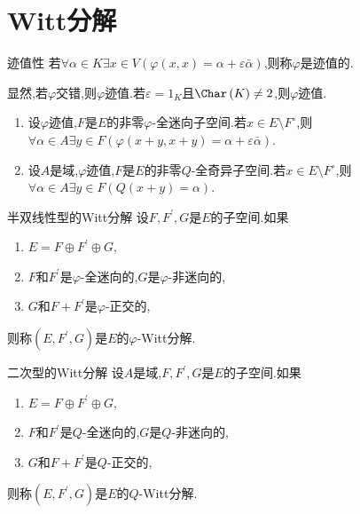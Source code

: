 \section{Witt分解}

\begin{definition}{迹值性}{}
	若$\forall\alpha\in K\exists x\in V\left(\varphi\left(x,x\right)=\alpha+\varepsilon\bar{\alpha}\right)$,则称$\varphi$是迹值的.
\end{definition}


\begin{remark}{}{}
	显然,若$\varphi$交错,则$\varphi$迹值.若$\varepsilon=1_{K}$且$\Char\left(K\right)\neq 2$,则$\varphi$迹值.
\end{remark}

\begin{lemma}{}{}
	\begin{enumerate}
		\item 设$\varphi$迹值,$F$是$E$的非零$\varphi$-全迷向子空间.若$x\in E\setminus F^{\circ}$,则$\forall\alpha\in A\exists y\in F\left(\varphi\left(x+y,x+y\right)=\alpha+\varepsilon\bar{\alpha}\right)$.
		\item 设$A$是域,$\varphi$迹值,$F$是$E$的非零$Q$-全奇异子空间.若$x\in E\setminus F^{\circ}$,则$\forall\alpha\in A\exists y\in F\left(Q\left(x+y\right)=\alpha\right)$.
	\end{enumerate}
\end{lemma}

\begin{definition}{半双线性型的Witt分解}{}
	设$F,F^{\prime},G$是$E$的子空间.如果
	\begin{enumerate}
		\item $E=F\oplus F^{\prime}\oplus G$,
		\item $F$和$F^{\prime}$是$\varphi$-全迷向的,$G$是$\varphi$-非迷向的,
		\item $G$和$F+F^{\prime}$是$\varphi$-正交的,
	\end{enumerate}
	则称$\left(E,F^{\prime},G\right)$是$E$的$\varphi$-Witt分解.
\end{definition}

\begin{definition}{二次型的Witt分解}{}
	设$A$是域,$F,F^{\prime},G$是$E$的子空间.如果
	\begin{enumerate}
		\item $E=F\oplus F^{\prime}\oplus G$,
		\item $F$和$F^{\prime}$是$Q$-全迷向的,$G$是$Q$-非迷向的,
		\item $G$和$F+F^{\prime}$是$Q$-正交的,
	\end{enumerate}
	则称$\left(E,F^{\prime},G\right)$是$E$的$Q$-Witt分解.
\end{definition}

